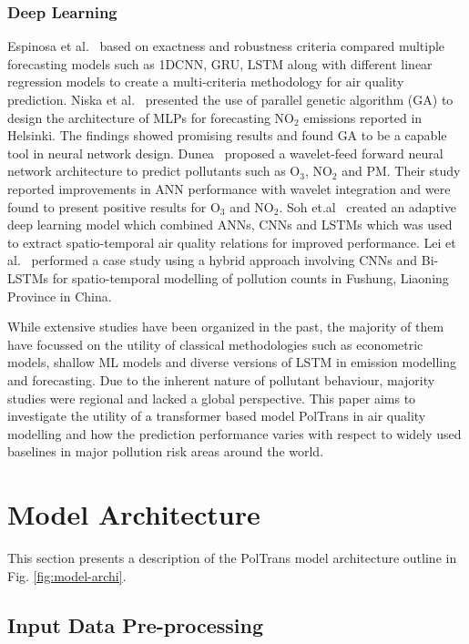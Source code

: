 \documentclass[10pt,journal]{IEEEtran}
\begin{document}
\subsubsection{Deep Learning} Espinosa et al.~\cite{Espinosa.2021} based on exactness and robustness criteria compared multiple forecasting models such as 1DCNN, GRU, LSTM along with different linear regression models to create a multi-criteria methodology for air quality prediction. Niska et al.~\cite{Niska.2004} presented the use of parallel genetic algorithm (GA) to design the architecture of MLPs for forecasting NO${_2}$ emissions reported in Helsinki. The findings showed promising results and found GA to be a capable tool in neural network design. Dunea~\cite{Dunea.2015} proposed a wavelet-feed forward neural network architecture to predict pollutants such as O${_3}$, NO${_2}$ and PM. Their study reported improvements in ANN performance with wavelet integration and were found to present positive results for O${_3}$ and NO${_2}$. Soh et.al~\cite{Soh.2018} created an adaptive deep learning model which combined ANNs, CNNs and LSTMs which was used to extract spatio-temporal air quality relations for improved performance. Lei et al.~\cite{Lei.2020} performed a case study using a hybrid approach involving CNNs and Bi-LSTMs for spatio-temporal modelling of pollution counts in Fushung, Liaoning Province in China.

While extensive studies have been organized in the past, the majority of them have focussed on the utility of classical methodologies such as econometric models, shallow ML models and diverse versions of LSTM in emission modelling and forecasting. Due to the inherent nature of pollutant behaviour, majority studies were regional and lacked a global perspective. This paper aims to investigate the utility of a transformer based model {PolTrans} in air quality modelling and how the prediction performance varies with respect to widely used baselines in major pollution risk areas around the world.

\section{Model Architecture}
\label{sec:model-archi}

This section presents a description of the {PolTrans} model architecture outline in Fig. \ref{fig:model-archi}.

\subsection{Input Data Pre-processing}
\end{document}
